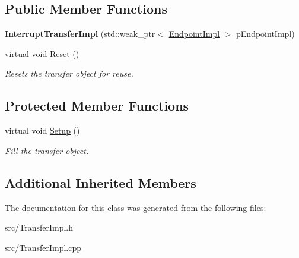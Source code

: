 \subsection*{Public Member Functions}
\begin{DoxyCompactItemize}
\item 
\hypertarget{class_lib_u_s_b_1_1_interrupt_transfer_impl_ad15385a60b8d2f90a3317c15777af777}{{\bfseries Interrupt\-Transfer\-Impl} (std\-::weak\-\_\-ptr$<$ \hyperlink{class_lib_u_s_b_1_1_endpoint_impl}{Endpoint\-Impl} $>$ p\-Endpoint\-Impl)}\label{class_lib_u_s_b_1_1_interrupt_transfer_impl_ad15385a60b8d2f90a3317c15777af777}

\item 
\hypertarget{class_lib_u_s_b_1_1_interrupt_transfer_impl_a0578993ecde4cb977d1c83c341c96dca}{virtual void \hyperlink{class_lib_u_s_b_1_1_interrupt_transfer_impl_a0578993ecde4cb977d1c83c341c96dca}{Reset} ()}\label{class_lib_u_s_b_1_1_interrupt_transfer_impl_a0578993ecde4cb977d1c83c341c96dca}

\begin{DoxyCompactList}\small\item\em Resets the transfer object for reuse. \end{DoxyCompactList}\end{DoxyCompactItemize}
\subsection*{Protected Member Functions}
\begin{DoxyCompactItemize}
\item 
\hypertarget{class_lib_u_s_b_1_1_interrupt_transfer_impl_a6787bd4e45da0dcab8e2bff13935c602}{virtual void \hyperlink{class_lib_u_s_b_1_1_interrupt_transfer_impl_a6787bd4e45da0dcab8e2bff13935c602}{Setup} ()}\label{class_lib_u_s_b_1_1_interrupt_transfer_impl_a6787bd4e45da0dcab8e2bff13935c602}

\begin{DoxyCompactList}\small\item\em Fill the transfer object. \end{DoxyCompactList}\end{DoxyCompactItemize}
\subsection*{Additional Inherited Members}


The documentation for this class was generated from the following files\-:\begin{DoxyCompactItemize}
\item 
src/Transfer\-Impl.\-h\item 
src/Transfer\-Impl.\-cpp\end{DoxyCompactItemize}
